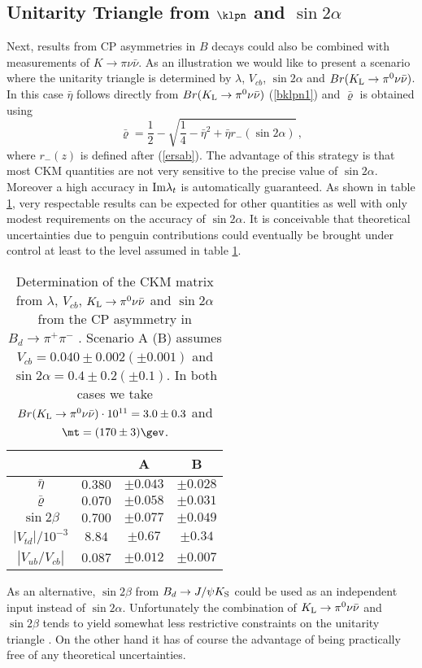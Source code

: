 \subsection{Unitarity Triangle from $\klpn$ and $\sin 2\alpha$}
Next, results from CP asymmetries in $B$ decays could also be
combined with measurements of $K\to\pi\nu\bar\nu$.
As an illustration we would like to present a scenario \cite{BB96}
where
the unitarity triangle is determined by $\lambda$, $V_{cb}$,
$\sin 2\alpha$ and $Br(K_{\rm L}\to\pi^0\nu\bar\nu)$.
In this case $\bar\eta$ follows directly from 
$Br(K_{\rm L}\to\pi^0\nu\bar\nu)$ (\ref{bklpn1}) and $\bar\varrho$ is
obtained using \cite{AJB94}
\begin{equation}\label{rhoalpha}
\bar\varrho=\frac{1}{2}-\sqrt{\frac{1}{4}-\bar\eta^2+
\bar\eta r_-(\sin 2\alpha)}\,,
\end{equation}
where $r_-(z)$ is defined after (\ref{ersab}).
The advantage of this strategy is that most CKM quantities are
not very sensitive to the precise value of $\sin 2\alpha$.
Moreover a high accuracy in 
${\rm Im}\lambda_t$ is automatically guaranteed. As shown in
table \ref{tabkl2a}, very respectable results can be expected
for other quantities as well with only modest requirements
on the accuracy of $\sin 2\alpha$. 
It is conceivable that theoretical uncertainties due to penguin
contributions could eventually be brought under control at least
to the level assumed in table \ref{tabkl2a}. 
\begin{table}
\caption[]{Determination of the CKM matrix from $\lambda$, $V_{cb}$,
$K_{\rm L}\to\pi^0\nu\bar\nu$ and $\sin 2\alpha$ from the CP asymmetry
in $B_d\to\pi^+\pi^-$ \cite{BB96}. Scenario A (B) assumes
$V_{cb}=0.040\pm 0.002 (\pm 0.001)$
and $\sin 2\alpha=0.4\pm 0.2 (\pm 0.1)$. In both cases we take
$Br(K_{\rm L}\to\pi^0\nu\bar\nu)\cdot 10^{11}=3.0\pm 0.3$ and
$\mt=(170\pm 3)\gev$. 
\label{tabkl2a}}
\begin{center}
\begin{tabular}{|c||c|c|c|}\hline
&&A&B \\
\hline
\hline
$\bar\eta$&$0.380$&$\pm 0.043$&$\pm 0.028$ \\
\hline
$\bar\varrho$&$0.070$&$\pm 0.058$&$\pm 0.031$ \\
\hline
$\sin 2\beta$&$0.700$&$\pm 0.077$&$\pm 0.049$ \\
\hline
$|V_{td}|/10^{-3}$&$8.84$&$\pm 0.67$&$\pm 0.34$ \\
\hline
$|V_{ub}/V_{cb}|$&$0.087$&$\pm 0.012$&$\pm 0.007$ \\
\hline 
\end{tabular}
\end{center}
\end{table}
As an alternative, $\sin 2\beta$ from $B_d\to J/\psi K_{\rm S}$ 
could be used as an independent input instead of $\sin 2\alpha$.
Unfortunately the combination of $K_{\rm L}\to\pi^0\nu\bar\nu$ and
$\sin 2\beta$ tends to yield somewhat less restrictive constraints
on the unitarity triangle \cite{BB96}. 
On the other hand it has of course the
advantage of being practically free of any theoretical uncertainties.   

